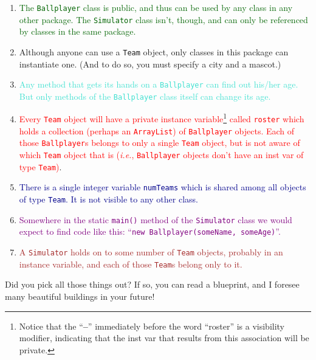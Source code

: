 \begin{enumerate}
\itemsep.1em

\item \textcolor{darkgreen}{The \texttt{Ballplayer} class is public, and thus
can be used by any class in any other package. The \texttt{Simulator} class
isn't, though, and can only be referenced by classes in the same package.}

\item \textcolor{BurntOrange}{Although anyone can use a \texttt{Team} object,
only classes in this package can instantiate one. (And to do so, you must
specify a city and a mascot.)} 

\item \textcolor{Turquoise}{Any method that gets its hands on a
\texttt{Ballplayer} can find out his/her age. But only methods of the
\texttt{Ballplayer} class itself can change its age.}

\item \textcolor{Red}{Every \texttt{Team} object will have a private instance
variable\footnote{Notice that the ``\textbf{--}'' immediately before the word
``roster'' is a visibility modifier, indicating that the inst var that results
from this association will be private.} called \texttt{roster} which holds a collection (perhaps an
\texttt{ArrayList}) of \texttt{Ballplayer} objects. Each of those
\texttt{Ballplayer}s belongs to only a single \texttt{Team} object, but is not
aware of which \texttt{Team} object that is (\textit{i.e.},
\texttt{Ballplayer} objects don't have an inst var of type \texttt{Team})}.

\item \textcolor{darkblue}{There is a single integer variable \texttt{numTeams}
which is shared among all objects of type \texttt{Team}. It is not visible to
any other class.}

\item \textcolor{Purple}{Somewhere in the static \texttt{main()} method of the
\texttt{Simulator} class we would expect to find code like this: ``\texttt{new
Ballplayer(someName, someAge)}''.}

\item \textcolor{Brown}{A \texttt{Simulator} holds on to some number of
\texttt{Team} objects, probably in an instance variable, and each of those
\texttt{Team}s belong only to it.}

\end{enumerate}

Did you pick all those things out? If so, you can read a blueprint, and I
foresee many beautiful buildings in your future!
